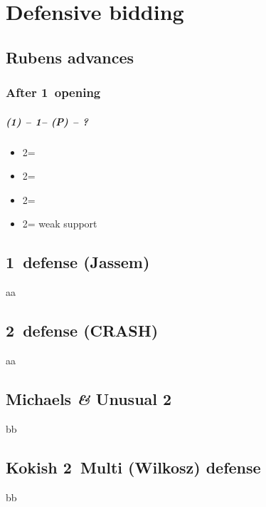 \documentclass[12pt, a4paper]{report}
\begin{document}
\part*{\colorbox{RoyalPurple!30}{Defensive bidding}}
 {
    
    \chapter*{\colorbox{Plum!30}{Rubens advances}}
     {
        \section*{\colorbox{blue!30}{After 1\clubs\ opening}}
         {

            \subsubsection*{(1\clubs) -- 1\spades -- (P) -- ?}
            \begin{itemize}
                \item 2\clubs = \trsf{\diams}
                \item 2\diams = \trsf{\hearts}
                \item 2\hearts = \trsf{\spades}
                \item 2\spades = weak support
            \end{itemize}
        }
    }

    \chapter*{\colorbox{Plum!30}{1\ntx\ defense (Jassem)}}
     {
        aa
    }

    \chapter*{\colorbox{Plum!30}{2\ntx\ defense (CRASH)}}
     {
        aa
    }

    \chapter*{\colorbox{Plum!30}{Michaels \textit{\&} Unusual 2\ntx}}
     {
        bb
    }

    \chapter*{\colorbox{Plum!30}{Kokish 2\diams\ Multi (Wilkosz) defense}}
     {
        bb
    }
}
\end{document}
